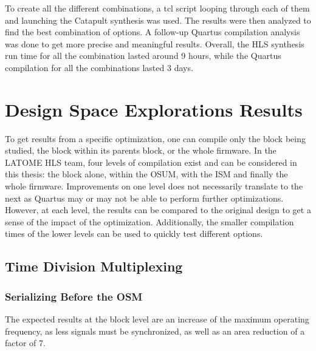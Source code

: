\begin{itemize}
To create all the different combinations, a tcl script looping through each of them and launching the Catapult synthesis was used. The results were then analyzed to find the best combination of options. A follow-up Quartus compilation analysis was done to get more precise and meaningful results. Overall, the HLS synthesis run time for all the combination lasted around 9 hours, while the Quartus compilation for all the combinations lasted 3 days.


\section{Design Space Explorations Results}

To get results from a specific optimization, one can compile only the block being studied, the block within its parents block, or the whole firmware. In the LATOME HLS team, four levels of compilation exist and can be considered in this thesis: the block alone, within the OSUM, with the ISM and finally the whole firmware. Improvements on one level does not necessarily translate to the next as Quartus may or may not be able to perform further optimizations. However, at each level, the results can be compared to the original design to get a sense of the impact of the optimization. Additionally, the smaller compilation times of the lower levels can be used to quickly test different options.


\subsection{Time Division Multiplexing}


\subsubsection{Serializing Before the OSM}

The expected results at the block level are an increase of the maximum operating frequency, as less signals must be synchronized, as well as an area reduction of a factor of 7.


\end{itemize}
